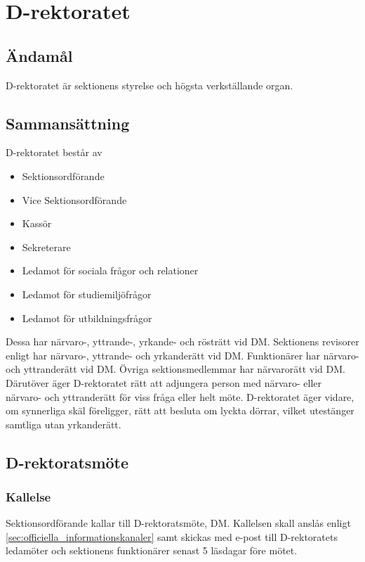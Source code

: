 \documentclass{dgovdoc}
\begin{document}
\section{D-rektoratet}

\subsection{Ändamål}

D-rektoratet är sektionens styrelse och högsta verkställande organ.

\subsection{Sammansättning}

D-rektoratet består av

\begin{itemize}
  \item Sektionsordförande
  \item Vice Sektionsordförande
  \item Kassör
  \item Sekreterare
  \item Ledamot för sociala frågor och relationer
  \item Ledamot för studiemiljöfrågor
  \item Ledamot för utbildningsfrågor
\end{itemize}

Dessa har närvaro-, yttrande-, yrkande- och rösträtt vid DM. Sektionens
revisorer enligt har närvaro-, yttrande- och yrkanderätt vid DM. Funktionärer
har närvaro- och yttranderätt vid DM. Övriga sektionsmedlemmar har närvarorätt
vid DM. Därutöver äger D-rektoratet rätt att adjungera person med närvaro-
eller närvaro- och yttranderätt för viss fråga eller helt möte. D-rektoratet
äger vidare, om synnerliga skäl föreligger, rätt att besluta om lyckta dörrar,
vilket utestänger samtliga utan yrkanderätt.

\subsection{D-rektoratsmöte}
\label{sec:d_rektoratsmote}

\subsubsection{Kallelse}

Sektionsordförande kallar till D-rektoratsmöte, DM. Kallelsen skall anslås
enligt \ref{sec:officiella_informationskanaler} samt skickas med e-post till
D-rektoratets ledamöter och sektionens funktionärer senast 5 läsdagar före
mötet.
\end{document}
